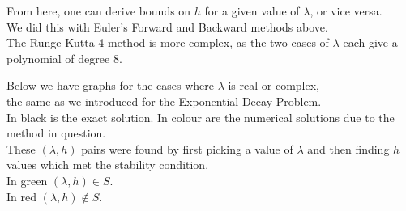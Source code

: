 \par From here, one can derive bounds on $h$ for a given value of $\lambda$, or vice versa.\\
We did this with Euler's Forward and Backward methods above.\\
The Runge-Kutta 4 method is more complex, as the two cases of $\lambda$ each give a polynomial of degree 8.\\

\par Below we have graphs for the cases where $\lambda$ is real or complex,\\
the same as we introduced for the Exponential Decay Problem.\\
In black is the exact solution. In colour are the numerical solutions due to the method in question.\\
These $(\lambda, h)$ pairs were found by first picking a value of $\lambda$ and then finding $h$ values which met the stability condition.\\
In green $(\lambda, h) \in S$.\\
In red $(\lambda, h) \notin S$.

